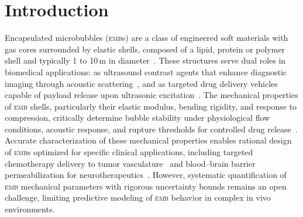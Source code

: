 \documentclass[%
 aip,
 jcp,
 amsmath,amssymb,
 preprint,%
]{revtex4-1}
\begin{document}
\maketitle

\section{Introduction}

Encapsulated microbubbles (\textsc{emb}s) are a class of engineered soft materials with gas cores surrounded by elastic shells, composed of a lipid, protein or polymer shell and typically 1 to 10\,\textmu m in diameter~\citep{stride2009physical,ferrara2007ultrasound}. These structures serve dual roles in biomedical applications: as ultrasound contrast agents that enhance diagnostic imaging through acoustic scattering~\citep{klibanov2006microbubble,datta2008ultrasound}, and as targeted drug delivery vehicles capable of payload release upon ultrasonic excitation~\citep{ferrara2007ultrasound,sirsi2014state,stride2010cavitation,coussios2008applications}. The mechanical properties of \textsc{emb} shells, particularly their elastic modulus, bending rigidity, and response to compression, critically determine bubble stability under physiological flow conditions, acoustic response, and rupture thresholds for controlled drug release~\citep{stride2009physical,guo2013investigation,stride2010cavitation,konofagou2012optimization}. Accurate characterization of these mechanical properties enables rational design of \textsc{emb}s optimized for specific clinical applications, including targeted chemotherapy delivery to tumor vasculature~\citep{tinkov2009microbubbles,tinkov2010new} and blood--brain barrier permeabilization for neurotherapeutics~\citep{hynynen2001noninvasive}. However, systematic quantification of \textsc{emb} mechanical parameters with rigorous uncertainty bounds remains an open challenge, limiting predictive modeling of \textsc{emb} behavior in complex in vivo environments.
\end{document}
